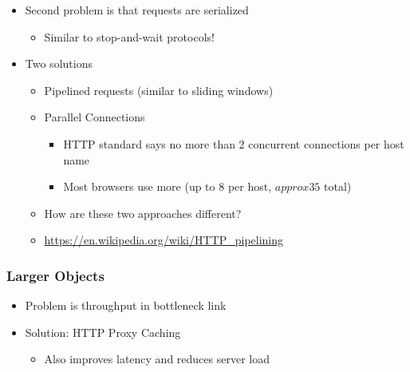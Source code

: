 \begin{itemize}[nosep]
    \item Second problem is that requests are serialized
          \begin{itemize}[nosep]
              \item Similar to stop-and-wait protocols!
          \end{itemize}
    \item Two solutions
          \begin{itemize}[nosep]
              \item Pipelined requests (similar to sliding windows)
              \item Parallel Connections
                    \begin{itemize}[nosep]
                        \item HTTP standard says no more than 2 concurrent connections per host name
                        \item Most browsers use more (up to 8 per host, $approx35$ total)
                    \end{itemize}
              \item How are these two approaches different?
              \item \url{https://en.wikipedia.org/wiki/HTTP_pipelining}
          \end{itemize}
\end{itemize}
\subsubsection{Larger Objects}
\begin{itemize}
    \item Problem is throughput in bottleneck link
    \item Solution: HTTP Proxy Caching
          \begin{itemize}[nosep]
              \item Also improves latency and reduces server load
          \end{itemize}
\end{itemize}
\begin{figure}[H]
\end{figure}